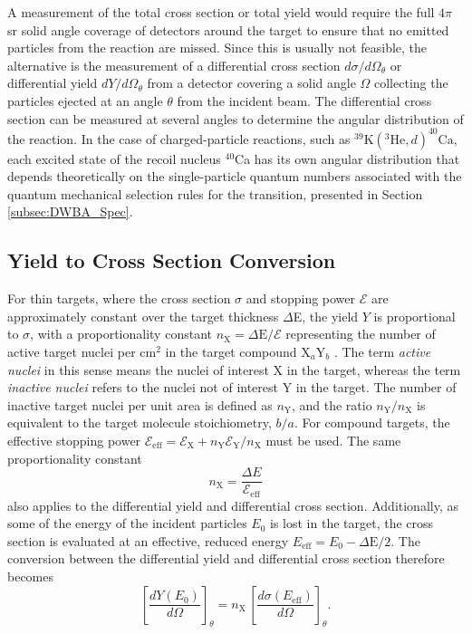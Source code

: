 A measurement of the total cross section or total yield would require the full $4\pi$ sr solid angle coverage of detectors around the target to ensure that no emitted particles from the reaction are missed. Since this is usually not feasible, the alternative is the measurement of a differential cross section $d\sigma/d\Omega_{\theta}$ or differential yield $dY/d\Omega_{\theta}$ from a detector covering a solid angle $\Omega$ collecting the particles ejected at an angle $\theta$ from the incident beam. The differential cross section can be measured at several angles to determine the angular distribution of the reaction. In the case of charged-particle reactions, such as $^{39}\mathrm{K}(^{3}\mathrm{He},d)^{40}\mathrm{Ca}$, each excited state of the recoil nucleus $^{40}$Ca has its own angular distribution that depends theoretically on the single-particle quantum numbers associated with the quantum mechanical selection rules for the transition, presented in Section \ref{subsec:DWBA_Spec}.

\subsection{Yield to Cross Section Conversion} \label{subsec:cs_calc}

For thin targets, where the cross section $\sigma$ and stopping power $\mathcal{E}$ are approximately constant over the target thickness $\Delta$E, the yield $Y$ is proportional to $\sigma$, with a proportionality constant $n_{\mathrm{X}} = \Delta \mathrm{E} / \mathcal{E}$ representing the number of active target nuclei per $\mathrm{cm}^{2}$ in the target compound $\mathrm{X}_{a}\mathrm{Y}_{b}$ \cite{Iliadis2015}. The term \emph{active nuclei} in this sense means the nuclei of interest $\mathrm{X}$ in the target, whereas the term \emph{inactive nuclei} refers to the nuclei not of interest $\mathrm{Y}$ in the target. The number of inactive target nuclei per unit area is defined as $n_{\mathrm{Y}}$, and the ratio $n_{\mathrm{Y}}/n_{\mathrm{X}}$ is equivalent to the target molecule stoichiometry, $b/a$. For compound targets, the effective stopping power $\mathcal{E}_{\mathrm{eff}} = \mathcal{E}_{\mathrm{X}} + n_{\mathrm{Y}}\mathcal{E}_{\mathrm{Y}} / n_{\mathrm{X}}$ must be used. The same proportionality constant 
\begin{equation}
n_{\mathrm{X}} = \frac{\Delta E}{\mathcal{E}_{\mathrm{eff}}}
\end{equation}
also applies to the differential yield and differential cross section. Additionally, as some of the energy of the incident particles $E_{0}$ is lost in the target, the cross section is evaluated at an effective, reduced energy $E_{\mathrm{eff}} = E_{0} - \Delta\mathrm{E}/2$. The conversion between the differential yield and differential cross section therefore becomes
\begin{equation}
\left[ \frac{dY(E_{0})}{d\Omega} \right]_{\theta} = n_{\mathrm{X}} \, \left[ \frac{d\sigma(E_{\mathrm{eff}})}{d\Omega} \right]_{\theta}.
\end{equation}

